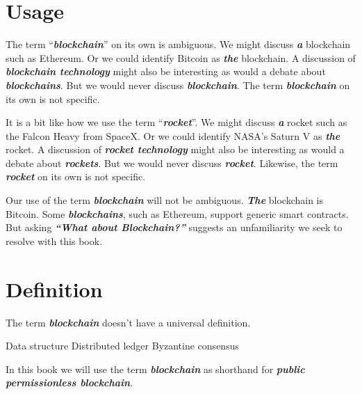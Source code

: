 \section{Usage}
The term ``\textbf{\textit{blockchain}}'' on its own is ambiguous.
We might discuss \textbf{\textit{a}} blockchain such as Ethereum.
Or we could identify Bitcoin as \textbf{\textit{the}} blockchain.
A discussion of \textbf{\textit{blockchain technology}} might also be interesting as would a debate about \textbf{\textit{blockchains}}.
But we would never discuss \textbf{\textit{blockchain}}.
The term \textbf{\textit{blockchain}} on its own is not specific.

It is a bit like how we use the term ``\textbf{\textit{rocket}}''.
We might discuss \textbf{\textit{a}} rocket such as the Falcon Heavy from SpaceX.
Or we could identify NASA's Saturn V as \textbf{\textit{the}} rocket.
A discussion of \textbf{\textit{rocket technology}} might also be interesting as would a debate about \textbf{\textit{rockets}}.
But we would never discuss \textbf{\textit{rocket}}.
Likewise, the term \textbf{\textit{rocket}} on its own is not specific.

Our use of the term \textbf{\textit{blockchain}} will not be ambiguous.
\textbf{\textit{The}} blockchain is Bitcoin.
Some \textbf{\textit{blockchains}}, such as Ethereum, support generic smart contracts.
But asking \textbf{\textit{``What about Blockchain?''}} suggests an unfamiliarity we seek to resolve with this book.

\section{Definition}
The term \textbf{\textit{blockchain}} doesn't have a universal definition.

Data structure
Distributed ledger
Byzantine consensus

In this book we will use the term \textbf{\textit{blockchain}} as shorthand for \textbf{\textit{public permissionless blockchain}}.
